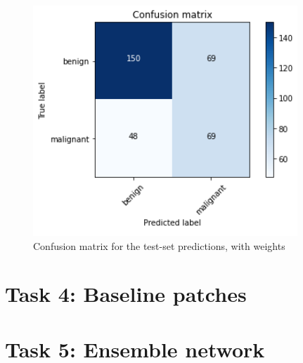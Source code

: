 \documentclass[11pt,a4paper,oneside]{article}
\begin{document}
\begin{figure}[h]
\begin{minipage}[c]{.4\textwidth}
		\includegraphics[width=.9\textwidth]{images/Task 3/VGG19 3.2/With Weights/Conf Matrix}
		\caption{Confusion matrix for the test-set predictions, with weights}
		\label{fig:vgg19_3.2_matrix}
	\end{minipage}%
\end{figure}


\section{Task 4: Baseline patches}


\section{Task 5: Ensemble network}
\end{document}
